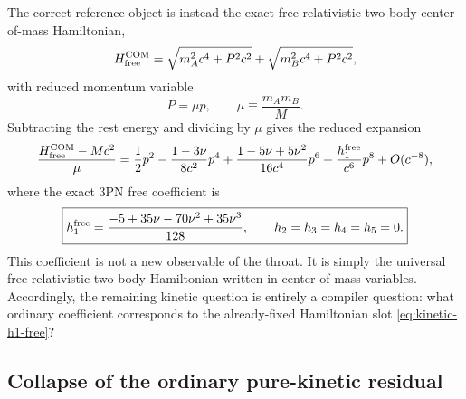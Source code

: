 \documentclass[11pt]{article}
\begin{document}
The correct reference object is instead the exact free relativistic two-body
center-of-mass Hamiltonian,
\begin{equation}
H_{\rm free}^{\rm COM}
=
\sqrt{m_A^2c^4+P^2c^2}
+
\sqrt{m_B^2c^4+P^2c^2},
\label{eq:kinetic-free-com-h-exact}
\end{equation}
with reduced momentum variable
\begin{equation}
P=\mu p,
\qquad
\mu\equiv \frac{m_Am_B}{M}.
\label{eq:kinetic-P-mu-p}
\end{equation}
Subtracting the rest energy and dividing by $\mu$ gives the reduced expansion
\begin{equation}
\frac{H_{\rm free}^{\rm COM}-Mc^2}{\mu}
=
\frac12 p^2
-
\frac{1-3\nu}{8c^2}p^4
+
\frac{1-5\nu+5\nu^2}{16c^4}p^6
+
\frac{h_1^{\rm free}}{c^6}p^8
+O(c^{-8}),
\label{eq:kinetic-free-com-h-series}
\end{equation}
where the exact $3$PN free coefficient is
\begin{equation}
\boxed{
 h_1^{\rm free}
 =
 \frac{-5+35\nu-70\nu^2+35\nu^3}{128},
 \qquad
 h_2=h_3=h_4=h_5=0.
}
\label{eq:kinetic-h1-free}
\end{equation}
This coefficient is not a new observable of the throat.  It is simply the
universal free relativistic two-body Hamiltonian written in center-of-mass
variables.  Accordingly, the remaining kinetic question is entirely a compiler
question: what ordinary coefficient corresponds to the already-fixed Hamiltonian
slot \eqref{eq:kinetic-h1-free}?

\subsection{Collapse of the ordinary pure-kinetic residual}
\label{sec:kinetic-collapse}
\end{document}
